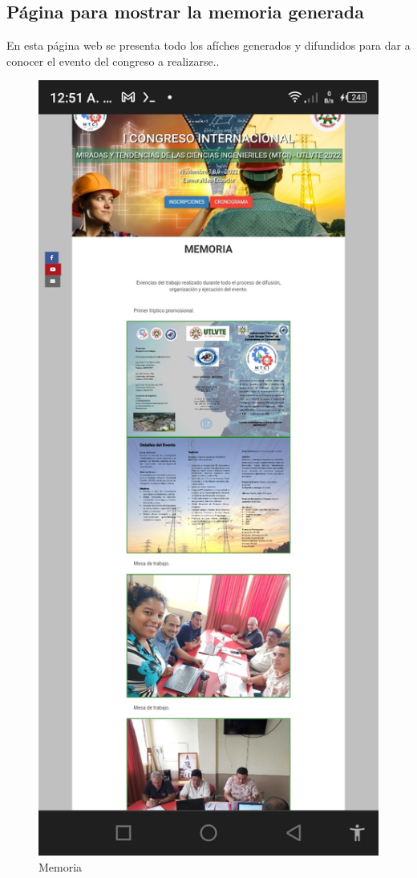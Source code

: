 \documentclass[a4paper,14px]{article}
\begin{document}
  





\newpage
\subsection{Página para mostrar la memoria generada}
\label{sec:pagina-principal}

En esta página web se presenta todo los afíches generados y difundidos para dar a conocer el evento del congreso a realizarse..


\begin{figure}[H]
  \centering
  \includegraphics[scale=0.3]{memoria.jpg}
  \caption{Memoria}
  \label{fig:arquitectura}
\end{figure}
\end{document}
